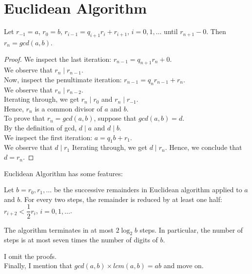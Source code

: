 \section{Euclidean Algorithm}

\begin{theorem}
Let $r_{-1} = a$, $r_{0} = b$, $r_{i - 1} = q_{i + 1}r_{i} + r_{i + 1}$, $i = 0, 1,\dots$ until $r_{n + 1} - 0$. Then $r_{n} = gcd(a, b)$.
\end{theorem}

\begin{proof}
We inspect the last iteration: $r_{n - 1} = q_{n + 1}r_{n} + 0$. \\
We observe that $r_{n}\mid r_{n - 1}$. \\
Now, inspect the penultimate iteration: $r_{n - 1} = q_{n}r_{n - 1} + r_{n}$. \\
We observe that $r_{n}\mid r_{n - 2}$. \\
Iterating through, we get $r_{n}\mid r_{0}$ and $r_{n}\mid r_{-1}$. \\
Hence, $r_{n}$ is a common divisor of $a$ and $b$. \\
To prove that $r_{n} = gcd(a, b)$, suppose that $gcd(a, b) = d$. \\
By the definition of gcd, $d\mid a$ and $d\mid b$. \\
We inspect the first iteration: $a = q_{1}b + r_{1}$. \\
We observe that $d\mid r_{1}$
Iterating through, we get $d\mid r_{n}$. Hence, we conclude that $d = r_{n}$.
\end{proof}

Euclidean Algorithm has some features:

\begin{observation}
Let $b = r_{0}, r_{1}, \dots$ be the successive remainders in Euclidean algorithm applied to $a$ and $b$. For every two steps, the remainder is reduced by at least one half: $r_{i + 2} < \dfrac{1}{2}r_{i}$, $i = 0, 1, \dots$.
\end{observation}

\begin{observation}
The algorithm terminates in at most $2\log_{2}b$ steps. In particular, the number of steps is at most seven times the number of digits of $b$.
\end{observation}

\noindent
I omit the proofs. \\
Finally, I mention that $gcd(a, b)\times lcm(a, b) = ab$ and move on.
